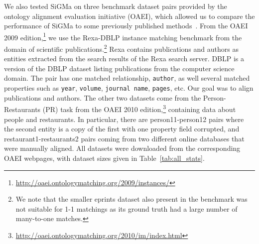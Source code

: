 \documentclass{sig-alternate}
\renewcommand{\tt}[1]{\texttt{#1}}
\newcommand{\ts}[1]{\textsf{#1}}
\begin{document}
We also tested \ts{SiGMa} on three benchmark dataset pairs provided by
the ontology alignment evaluation initiative (OAEI), which allowed us
to compare the performance of \ts{SiGMa} to some previously published methods~\cite{li09RiMOM,hu11objectCoref}.
 From the OAEI 2009
 edition,\footnote{\href{http://oaei.ontologymatching.org/2009/instances/}{http://oaei.ontologymatching.org/2009/instances/}}
 we use the \textsf{Rexa}-\textsf{DBLP} instance matching benchmark
 from the domain of scientific publications.\footnote{We note that the
   smaller \ts{eprints} dataset also present in the benchmark was not
   suitable for 1-1 matchings as its ground truth had a large number
   of many-to-one matches.} \ts{Rexa} contains publications and
 authors as entities extracted from the search results of the \ts{Rexa} search
 server. \textsf{DBLP} is a version of the DBLP dataset
 listing publications from the computer science domain. The pair has
 one matched relationship, \texttt{author}, as well several matched
 properties such as \tt{year}, \tt{volume}, \tt{journal name},
 \tt{pages}, etc. Our goal was to align publications and authors. The other two datasets come from the Person-Restaurants (PR) task from the OAEI 2010 edition,\footnote{\href{http://oaei.ontologymatching.org/2010/im/index.html}{http://oaei.ontologymatching.org/2010/im/index.html}} containing data about people and restaurants. In particular, there are \textsf{person11}-\textsf{person12} pairs where the second entity is a copy of the first with one property field corrupted, and \textsf{restaurant1}-\textsf{restaurants2} pairs coming from two different online databases that were manually aligned. All datasets were downloaded from the corresponding OAEI webpages, with dataset sizes given in Table~\ref{tab:all_stats}.
%
\begin{table}
\centering
{}
\caption{Datasets statistics}\label{tab:all_stats}
\end{table}
\end{document}
